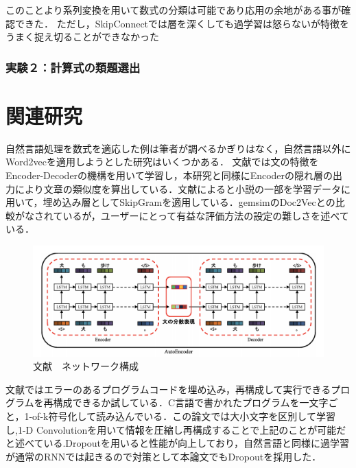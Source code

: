 \documentclass[a4j,11pt,report]{jsbook}
\begin{document}
このことより系列変換を用いて数式の分類は可能であり応用の余地がある事が確認できた．
ただし，SkipConnectでは層を深くしても過学習は怒らないが特徴をうまく捉え切ることができなかった

\subsection{実験２：計算式の類題選出}






\chapter{関連研究\label{ch:relsatedwork}}
自然言語処理を数式を適応した例は筆者が調べるかぎりはなく，自然言語以外にWord2vecを適用しようとした研究はいくつかある．
文献\cite{kannrenn3}では文の特徴をEncoder-Decoderの機構を用いて学習し，本研究と同様にEncoderの隠れ層の出力により文章の類似度を算出している．文献\cite{kannrenn3}によると小説の一部を学習データに用いて，埋め込み層としてSkipGramを適用している．gemsimのDoc2Vecとの比較がなされているが，ユーザーにとって有益な評価方法の設定の難しさを述べている．

\begin{center}
  \begin{figure}[H]
    \centering
    \includegraphics[width=\linewidth]{image/lstm_hidden_vecter.png}
    \caption{文献\cite{kannrenn3}　ネットワーク構成}
    \label{fig:kannrenn3fig}
  \end{figure}
\end{center}

文献\cite{lannrenn4}ではエラーのあるプログラムコードを埋め込み，再構成して実行できるプログラムを再構成できるか試している．C言語で書かれたプログラムを一文字ごと，1-of-k符号化して読み込んでいる．この論文では大小文字を区別して学習し,1-D Convolutionを用いて情報を圧縮し再構成することで上記のことが可能だと述べている.Dropoutを用いると性能が向上しており，自然言語と同様に過学習が通常のRNNでは起きるので対策として本論文でもDropoutを採用した．
\end{document}
